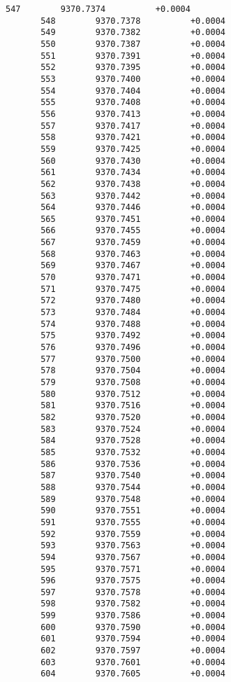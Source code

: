 \documentclass[11pt]{article}
\begin{document}
\begin{Verbatim}[commandchars=\\\{\}]
       547        9370.7374          +0.0004
       548        9370.7378          +0.0004
       549        9370.7382          +0.0004
       550        9370.7387          +0.0004
       551        9370.7391          +0.0004
       552        9370.7395          +0.0004
       553        9370.7400          +0.0004
       554        9370.7404          +0.0004
       555        9370.7408          +0.0004
       556        9370.7413          +0.0004
       557        9370.7417          +0.0004
       558        9370.7421          +0.0004
       559        9370.7425          +0.0004
       560        9370.7430          +0.0004
       561        9370.7434          +0.0004
       562        9370.7438          +0.0004
       563        9370.7442          +0.0004
       564        9370.7446          +0.0004
       565        9370.7451          +0.0004
       566        9370.7455          +0.0004
       567        9370.7459          +0.0004
       568        9370.7463          +0.0004
       569        9370.7467          +0.0004
       570        9370.7471          +0.0004
       571        9370.7475          +0.0004
       572        9370.7480          +0.0004
       573        9370.7484          +0.0004
       574        9370.7488          +0.0004
       575        9370.7492          +0.0004
       576        9370.7496          +0.0004
       577        9370.7500          +0.0004
       578        9370.7504          +0.0004
       579        9370.7508          +0.0004
       580        9370.7512          +0.0004
       581        9370.7516          +0.0004
       582        9370.7520          +0.0004
       583        9370.7524          +0.0004
       584        9370.7528          +0.0004
       585        9370.7532          +0.0004
       586        9370.7536          +0.0004
       587        9370.7540          +0.0004
       588        9370.7544          +0.0004
       589        9370.7548          +0.0004
       590        9370.7551          +0.0004
       591        9370.7555          +0.0004
       592        9370.7559          +0.0004
       593        9370.7563          +0.0004
       594        9370.7567          +0.0004
       595        9370.7571          +0.0004
       596        9370.7575          +0.0004
       597        9370.7578          +0.0004
       598        9370.7582          +0.0004
       599        9370.7586          +0.0004
       600        9370.7590          +0.0004
       601        9370.7594          +0.0004
       602        9370.7597          +0.0004
       603        9370.7601          +0.0004
       604        9370.7605          +0.0004

\end{Verbatim}
\end{document}
